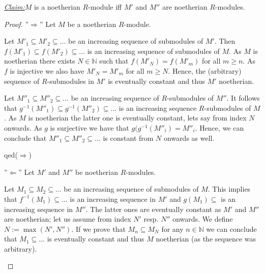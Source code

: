 \documentclass{article}
\newcommand{\N}{\mathbb{N}}
\newcommand{\inv}[1]{{#1}^{-1}}
\newcommand{\claim}
{\underline{\textit{Claim:}}\hspace{0,2cm}}
\newcommand{\subqed}[1]{\hfill\textsf{qed}({#1})}
\theoremstyle{definition}
\theoremstyle{plain}
\theoremstyle{remark}
\begin{document}
\claim $M$ is a noetherian $R$-module iff $M'$ and $M''$ are noetherian $R$-modules.
\begin{proof}
''$\Longrightarrow$'' Let $M$ be a noetherian $R$-module. 

Let $M'_1\subseteq M'_2 \subseteq ...$ be an increasing sequence of submodules of $M'$. Then $f(M'_1)\subseteq f(M'_2)\subseteq ...$ is an increasing sequence of submodules of $M$. As $M$ is noetherian there exists $N\in \N$ such that $f(M'_N)=f(M'_m)$ for all $m\geq n$. As $f$ is injective we also have $M'_N = M'_m$ for all $m\geq N$. Hence, the (arbitrary) sequence of $R$-submodules in $M'$ is eventually constant and thus $M'$ noetherian.\smallskip

Let $M''_1\subseteq M''_2\subseteq ...$ be an increasing sequence of $R$-submodules of $M''$. It follows that $\inv{g}(M''_1)\subseteq\inv{g}(M''_2)\subseteq ...$ is an increasing sequence $R$-submodules of $M$. As $M$ is noetherian the latter one is eventually constant, lets say from index $N$ onwards. As $g$ is surjective we have that $g(\inv{g}(M''_i)=M''_i$. Hence, we can conclude that $M''_1\subseteq M''_2\subseteq ...$ is constant from $N$ onwards as well. 

\subqed{$\Rightarrow$}

''$\Longleftarrow$'' Let $M'$ and $M''$ be noetherian $R$-modules.

Let $M_1\subseteq M_2 \subseteq ...$ be an increasing sequence of submodules of $M$.
This implies that $\inv{f}(M_1)\subseteq ...$ is an increasing sequence in $M'$ and $g(M_1)\subseteq$ is an increasing sequence in $M''$. The latter ones are eventually constant as $M'$ and $M''$ are noetherian; let us assume from index $N'$ resp. $N''$ onwards. We define $N:=\max(N',N'')$. If we prove that $M_n\subseteq M_N$ for any $n\in\N$ we can conclude that $M_1\subseteq ...$ is eventually constant and thus $M$ noetherian (as the sequence was arbitrary).
\begin{figure}[ht]
\centering
{}
\caption{}\label{Ex.6Diagram}
\end{figure}


\end{proof}
\end{document}
